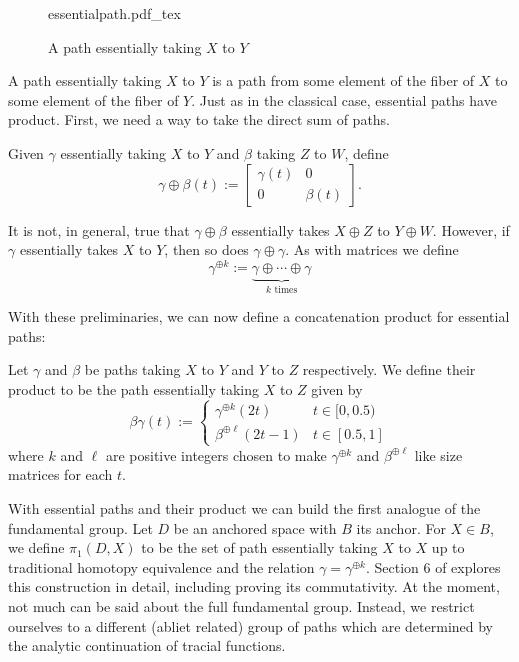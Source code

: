\begin{figure}[h!]
\centering
  \def\svgwidth{0.9\columnwidth}
  {essentialpath.pdf_tex}
\caption{A path essentially taking \(X\) to \(Y\)}
\label{fig:esspath}
\end{figure}
A path essentially taking \(X\) to \(Y\) is a path from some element of the
fiber of \(X\) to some element of the fiber of \(Y\). Just as in the classical
case, essential paths have product. First, we need a way to take the direct sum
of paths.

\begin{definition}%
  Given \(\gamma\) essentially taking \(X\) to \(Y\) and \(\beta\) taking \(Z\)
  to \(W\), define
  \[
    \gamma\oplus\beta(t) := \begin{bmatrix} \gamma(t)&0\\0&\beta(t) \end{bmatrix}.
  \]
\end{definition}

It is not, in general, true that \(\gamma\oplus\beta\) essentially takes
\(X\oplus Z\) to \(Y \oplus W\). However, if \(\gamma\) essentially takes \(X\)
to \(Y\), then so does \(\gamma\oplus\gamma\). As with matrices we define
\[
  \gamma^{\oplus k} := \underbrace{\gamma\oplus \cdots \oplus\gamma}_{k \text{ times}}
\]

With these preliminaries, we can now define a concatenation product for
essential paths:
\begin{definition}%
\label{def:concatprod}
  Let \(\gamma\) and \(\beta\) be paths taking \(X\) to \(Y\) and \(Y\) to \(Z\)
  respectively. We define their product to be the path essentially taking \(X\)
  to \(Z\) given by
  \[
    \beta\gamma(t) :=
    \begin{cases}
      \gamma^{\oplus k}(2t) & t \in [0,0.5) \\
      \beta^{\oplus\ell} (2t-1)& t \in [0.5,1]
    \end{cases}
  \]
  where \(k\) and \(\ell\) are positive integers chosen to make
  \(\gamma^{\oplus k}\) and \(\beta^{\oplus \ell}\) like size matrices for each \(t\).
\end{definition}

With essential paths and their product we can build the first analogue of the
fundamental group. Let \(D\) be an anchored space with \(B\) its anchor. For
\(X \in B\), we define \(\pi_1(D,X)\) to be the set of path essentially taking
\(X\) to \(X\) up to traditional homotopy equivalence and the relation
\(\gamma=\gamma^{\oplus k}\). Section 6 of
\cite{pascoeFreeNoncommutativePrincipal2020} explores this construction in
detail, including proving its commutativity.
At the moment, not much can be said about the full fundamental group. Instead,
we restrict ourselves to a different (abliet related) group of paths which are
determined by the analytic continuation of tracial functions.

